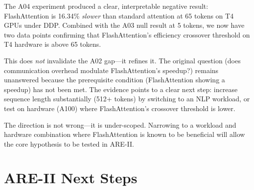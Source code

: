 \documentclass[12pt, a4paper]{article}
\begin{document}
The A04 experiment produced a clear, interpretable negative result: FlashAttention is 16.34\% \textit{slower} than standard attention at 65 tokens on T4 GPUs under DDP. Combined with the A03 null result at 5 tokens, we now have two data points confirming that FlashAttention's efficiency crossover threshold on T4 hardware is above 65 tokens.

This does \textit{not} invalidate the A02 gap---it refines it. The original question (does communication overhead modulate FlashAttention's speedup?) remains unanswered because the prerequisite condition (FlashAttention showing a speedup) has not been met. The evidence points to a clear next step: increase sequence length substantially (512+ tokens) by switching to an NLP workload, or test on hardware (A100) where FlashAttention's crossover threshold is lower.

The direction is not wrong---it is under-scoped. Narrowing to a workload and hardware combination where FlashAttention is known to be beneficial will allow the core hypothesis to be tested in ARE-II.

\section{ARE-II Next Steps}
\end{document}
